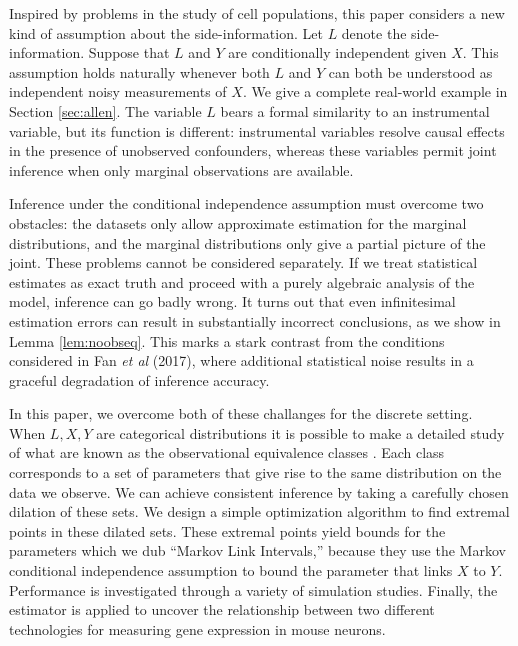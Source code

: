 \documentclass{article}
\theoremstyle{definition}
\begin{document}
Inspired by problems in the study of cell populations, this paper considers a new kind of assumption about the side-information.  Let $L$ denote the side-information.  Suppose that $L$ and $Y$ are conditionally independent given $X$.  This assumption holds naturally whenever both $L$ and $Y$ can both be understood as independent noisy measurements of $X$.  We give a complete real-world example in Section \ref{sec:allen}.  The variable $L$ bears a formal similarity to an instrumental variable, but its function is different: instrumental variables resolve causal effects in the presence of unobserved confounders, whereas these variables permit joint inference when only marginal observations are available. 

Inference under the conditional independence assumption must overcome two obstacles: the datasets only allow approximate estimation for the marginal distributions, and the marginal distributions only give a partial picture of the joint.  These problems cannot be considered separately.  If we treat statistical estimates as exact truth and proceed with a purely algebraic analysis of the model, inference can go badly wrong.  It turns out that even infinitesimal estimation errors can result in substantially incorrect conclusions, as we show in Lemma \ref{lem:noobseq}.   This marks a stark contrast from the conditions considered in Fan \emph{et al} (2017), where additional statistical noise results in a graceful degradation of inference accuracy.  

In this paper, we overcome both of these challanges for the discrete setting.  When $L,X,Y$ are categorical distributions it is possible to make a detailed study of what are known as the observational equivalence classes \cite{paulino1994identifiability,hauser2012characterization,tong1991indeterminacy}.  Each class corresponds to a set of parameters that give rise to the same distribution on the data we observe.  We can achieve consistent inference by taking a carefully chosen dilation of these sets.  We design a simple optimization algorithm to find extremal points in these dilated sets.  These extremal points yield bounds for the parameters which we dub ``Markov Link Intervals,'' because they use the Markov conditional independence assumption to bound the parameter that links $X$ to $Y$.    Performance is investigated through a variety of simulation studies.  Finally, the estimator is applied to uncover the relationship between two different technologies for measuring gene expression in mouse neurons.
\end{document}
